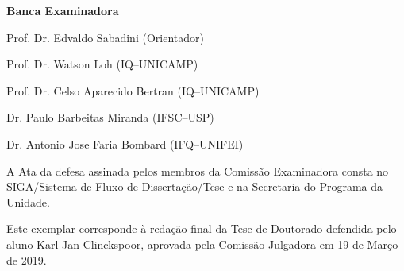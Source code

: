 \documentclass[
	12pt,				%
	openright,			%
	twoside,			%
	a4paper,			%
	english,			%
	brazil%
	]{abntex2}
\begin{document}
%
% 
%
\begin{folhadeaprovacao}

%
%    

	{\Large\ABNTEXchapterfont\textbf{Banca Examinadora}}
	
	\vspace{1cm}
	
	Prof. Dr. Edvaldo Sabadini (Orientador)
	
	Prof. Dr. Watson Loh (IQ--UNICAMP)
	
	Prof. Dr. Celso Aparecido Bertran (IQ--UNICAMP)
	
	Dr. Paulo Barbeitas Miranda (IFSC--USP)
	
	Dr. Antonio Jose Faria Bombard (IFQ--UNIFEI)
	
	\vspace*{\fill}
	
	\noindent A Ata da defesa assinada pelos membros da Comissão Examinadora consta no SIGA/Sistema de Fluxo de Dissertação/Tese e na Secretaria do Programa da Unidade.
	
	\vspace*{\fill}
	
	\hspace*{\fill}\begin{minipage}[r][5cm]{6cm}		%
		Este exemplar corresponde à redação final da Tese de Doutorado defendida pelo aluno Karl Jan Clinckspoor, aprovada pela Comissão Julgadora em 19 de Março de 2019.
	\end{minipage}
	


\end{folhadeaprovacao}
\end{document}
